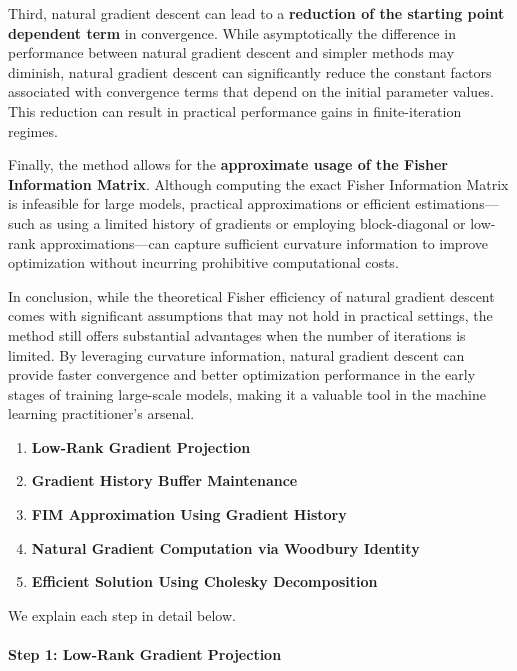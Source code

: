 Third, natural gradient descent can lead to a \textbf{reduction of the starting point dependent term} in convergence. While asymptotically the difference in performance between natural gradient descent and simpler methods may diminish, natural gradient descent can significantly reduce the constant factors associated with convergence terms that depend on the initial parameter values. This reduction can result in practical performance gains in finite-iteration regimes.

Finally, the method allows for the \textbf{approximate usage of the Fisher Information Matrix}. Although computing the exact Fisher Information Matrix is infeasible for large models, practical approximations or efficient estimations—such as using a limited history of gradients or employing block-diagonal or low-rank approximations—can capture sufficient curvature information to improve optimization without incurring prohibitive computational costs.

In conclusion, while the theoretical Fisher efficiency of natural gradient descent comes with significant assumptions that may not hold in practical settings, the method still offers substantial advantages when the number of iterations is limited. By leveraging curvature information, natural gradient descent can provide faster convergence and better optimization performance in the early stages of training large-scale models, making it a valuable tool in the machine learning practitioner's arsenal.


\begin{enumerate}
    \item \textbf{Low-Rank Gradient Projection}
    \item \textbf{Gradient History Buffer Maintenance}
    \item \textbf{FIM Approximation Using Gradient History}
    \item \textbf{Natural Gradient Computation via Woodbury Identity}
    \item \textbf{Efficient Solution Using Cholesky Decomposition}
\end{enumerate}

We explain each step in detail below.

\paragraph{Step 1: Low-Rank Gradient Projection}



